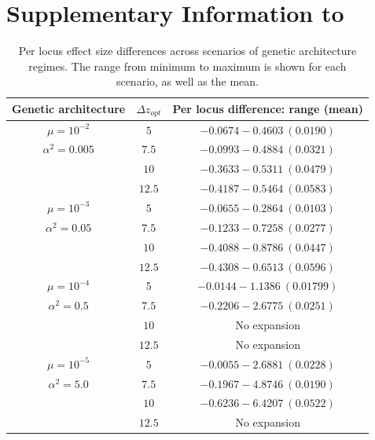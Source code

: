 \chapter{Supplementary Information to }


\renewcommand{\thetable}{B\arabic{table}}
\setcounter{table}{0}

\begin{table}[h]
\centering \small
\caption[Per locus effect size differences]{Per locus effect size differences across scenarios of genetic architecture regimes. The range from minimum to maximum is shown for each scenario, as well as the mean.}
\label{tab:effects}
\begin{tabular}{ccc}
Genetic architecture	&	$\Delta z_{opt}$	&	Per locus difference: range (mean)  \\ \hline \hline
$\mu = 10^{-2}$	& $5$		& $-0.0674 - 0.4603 ~ (0.0190)$	\\ 
$\alpha^2 = 0.005$	& $7.5$		& $-0.0993 - 0.4884 ~ (0.0321)$	\\ 
				& $10$		& $-0.3633 - 0.5311 ~ (0.0479)$	\\ 
				& $12.5$		& $-0.4187 - 0.5464 ~ (0.0583)$	\\ \hline
$\mu = 10^{-3}$	& $5$		& $-0.0655 - 0.2864 ~ (0.0103)$	\\ 
$\alpha^2 = 0.05$	& $7.5$		& $-0.1233 - 0.7258 ~ (0.0277)$	\\ 
				& $10$		& $-0.4088 - 0.8786 ~ (0.0447)$	\\ 
				& $12.5$		& $-0.4308 - 0.6513 ~ (0.0596)$	\\ \hline
$\mu = 10^{-4}$	& $5$		& $-0.0144 - 1.1386 ~ (0.01799)$	\\ 
$\alpha^2 = 0.5$	& $7.5$		& $-0.2206 - 2.6775 ~ (0.0251)$	\\ 
				& $10$		& No expansion	\\ 
				& $12.5$		& No expansion	\\ \hline
$\mu = 10^{-5}$	& $5$		& ${-0.0055} - 2.6881 ~ (0.0228)$	\\ 
$\alpha^2 = 5.0$	& $7.5$		& $-0.1967 - 4.8746 ~ (0.0190)$	\\ 
				& $10$		& $-0.6236 - 6.4207 ~ (0.0522)$	\\ 
				& $12.5$		& No expansion	\\ \hline
\end{tabular}
\end{table}



